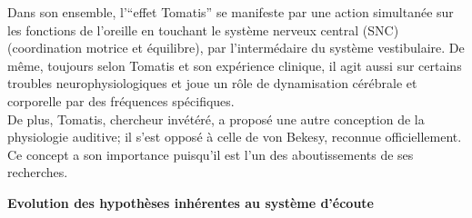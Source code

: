Dans son ensemble, l'``effet Tomatis''%
 se manifeste par une 
action
simultanée sur les fonctions de
l'oreille en touchant le système nerveux central (SNC) (coordination
                motrice et équilibre), par l'intermédaire du système
                vestibulaire.
                De même, toujours selon Tomatis et son expérience clinique, il agit aussi sur certains troubles
                neurophysiologiques et  joue un rôle de dynamisation cérébrale et corporelle
                par des fréquences spécifiques.
\\
De plus, Tomatis, chercheur invétéré, a proposé une autre conception de  la physiologie auditive; il  s'est 
opposé à celle 
de von Bekesy, 
reconnue officiellement. Ce concept a son importance puisqu'il est l'un des aboutissements de ses 
recherches.



\textbf{Evolution des hypothèses inhérentes au système d'écoute}


